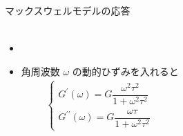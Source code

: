 \documentclass[12pt, dvipdfmx]{beamer}
\begin{document}
\begin{frame}
\begin{columns}[c, onlytextwidth]
\begin{block}{マックスウェルモデルの応答}
\begin{itemize}
\begin{align*}
						\end{align*}
						\item \vspace{-3mm}
						\item 角周波数 $\omega$ の動的ひずみを入れると
						\vspace{-3mm}
						\begin{align*}
							\begin{cases}
								G^{\prime}(\omega) = G\dfrac{\omega^2 \tau^2}{1+\omega^2\tau^2} \\[12pt]
								G^{\prime \prime}(\omega) = G\dfrac{\omega \tau}{1+\omega^2\tau^2}
							\end{cases}
						\end{align*}
					\end{itemize}		
				\end{block}
		\end{columns}
\end{frame}
\end{document}
